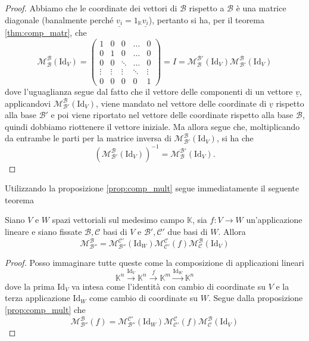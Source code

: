 \begin{proof}
  Abbiamo che le coordinate dei vettori di $\mathcal{B}$ rispetto a $\mathcal{B}$ è una matrice diagonale (banalmente perché $\underline{v_i} = 1_\mathbb{K} \underline{v_i}$), pertanto si ha, per il teorema \ref{thm:comp_matr}, che
  $$
    \mathcal{M}^\mathcal{B}_\mathcal{B}(\text{Id}_V) = \begin{pmatrix}
      1 & 0 & 0 & \ldots & 0 \\
      0 & 1 & 0 & \ldots & 0 \\
      0 & 0 & \ddots & \ldots & 0 \\
      \vdots & \vdots & \vdots & \ddots & \vdots \\
      0 & 0 & 0 & 0 & 1
    \end{pmatrix} = I = \mathcal{M}^\mathcal{B'}_\mathcal{B}(\text{Id}_V) \mathcal{M}^\mathcal{B}_\mathcal{B'}(\text{Id}_V)
  $$
  dove l'uguaglianza segue dal fatto che il vettore delle componenti di un vettore $\underline{v}$, applicandovi $\mathcal{M}^{\mathcal{B}}_\mathcal{B'}(\text{Id}_V)$, viene mandato nel vettore delle coordinate di $\underline{v}$ rispetto alla base $\mathcal{B'}$ e poi viene riportato nel vettore delle coordinate rispetto alla base $\mathcal{B}$, quindi dobbiamo riottenere il vettore iniziale. Ma allora segue che, moltiplicando da entrambe le parti per la matrice inversa di $\mathcal{M}^\mathcal{B}_\mathcal{B'}(\text{Id}_V)$, si ha che
  $$
    (\mathcal{M}^\mathcal{B}_\mathcal{B'}(\text{Id}_V))^{-1} = \mathcal{M}^{\mathcal{B'}}_\mathcal{B}(\text{Id}_V).
  $$
\end{proof}
Utilizzando la proposizione \ref{prop:comp_mult} segue immediatamente il seguente teorema
\begin{theorem} \label{thm:form_camb_base_app_lin}
  Siano $V$ e $W$ spazi vettoriali sul medesimo campo $\mathbb{K}$, sia $f: V \to W$ un'applicazione lineare e siano fissate $\mathcal{B}, \mathcal{C}$ basi di $V$ e $\mathcal{B}', \mathcal{C}'$ due basi di $W$. Allora
  $$
    \mathcal{M}^{\mathcal{B}}_{\mathcal{B}''} = \mathcal{M}^{\mathcal{C}'}_{\mathcal{B}''}(\text{Id}_W) \mathcal{M}^{\mathcal{C}}_{\mathcal{C}'}(f) \mathcal{M}^{\mathcal{B}}_\mathcal{C}(\text{Id}_V)
  $$
\end{theorem}
\begin{proof}
  Posso immaginare tutte queste come la composizione di applicazioni lineari
  $$
    \mathbb{K}^n \stackrel{\text{Id}_V}{\to} \mathbb{K}^n \stackrel{f}{\to} \mathbb{K}^m \stackrel{\text{Id}_W}{\to} \mathbb{K}^n
  $$
  dove la prima $\text{Id}_V$ va intesa come l'identità con cambio di coordinate su $V$ e la terza applicazione $\text{Id}_W$ come cambio di coordinate su $W$. Segue dalla proposizione \ref{prop:comp_mult} che
  $$
    \mathcal{M}^{\mathcal{B}}_{\mathcal{B}''}(f) = \mathcal{M}^{\mathcal{C}'}_{\mathcal{B}''}(\text{Id}_W) \mathcal{M}^{\mathcal{C}}_{\mathcal{C}'}(f) \mathcal{M}^{\mathcal{B}}_\mathcal{C}(\text{Id}_V)
  $$
\end{proof}

